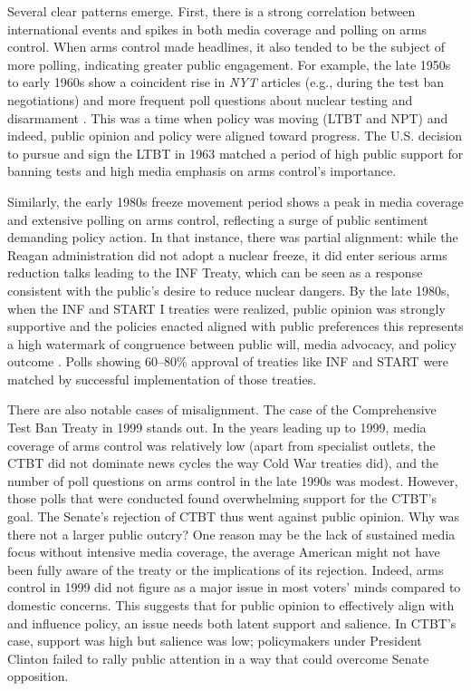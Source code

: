 \documentclass[11,5 pt]{article}
\begin{document}
    Several clear patterns emerge. First, there is a strong correlation between international events and spikes in both media coverage and polling on arms control. When arms control made headlines, it also tended to be the subject of more polling, indicating greater public engagement. For example, the late 1950s to early 1960s show a coincident rise in \textit{NYT} articles (e.g., during the test ban negotiations) and more frequent poll questions about nuclear testing and disarmament \cite{BritannicaNuclearTestBan}. This was a time when policy was moving (LTBT and NPT) and indeed, public opinion and policy were aligned toward progress. The U.S. decision to pursue and sign the LTBT in 1963 matched a period of high public support for banning tests and high media emphasis on arms control’s importance. 
    
    Similarly, the early 1980s freeze movement period shows a peak in media coverage and extensive polling on arms control, reflecting a surge of public sentiment demanding policy action. In that instance, there was partial alignment: while the Reagan administration did not adopt a nuclear freeze, it did enter serious arms reduction talks leading to the INF Treaty, which can be seen as a response consistent with the public’s desire to reduce nuclear dangers. By the late 1980s, when the INF and START I treaties were realized, public opinion was strongly supportive and the policies enacted aligned with public preferences this represents a high watermark of congruence between public will, media advocacy, and policy outcome \cite{TIME1987}. Polls showing 60–80\% approval of treaties like INF and START were matched by successful implementation of those treaties. 
    
    There are also notable cases of misalignment. The case of the Comprehensive Test Ban Treaty in 1999 stands out. In the years leading up to 1999, media coverage of arms control was relatively low (apart from specialist outlets, the CTBT did not dominate news cycles the way Cold War treaties did), and the number of poll questions on arms control in the late 1990s was modest. However, those polls that were conducted found overwhelming support for the CTBT’s goal. The Senate’s rejection of CTBT thus went against public opinion. Why was there not a larger public outcry? One reason may be the lack of sustained media focus without intensive media coverage, the average American might not have been fully aware of the treaty or the implications of its rejection. Indeed, arms control in 1999 did not figure as a major issue in most voters’ minds compared to domestic concerns. This suggests that for public opinion to effectively align with and influence policy, an issue needs both latent support and salience. In CTBT’s case, support was high but salience was low; policymakers under President Clinton failed to rally public attention in a way that could overcome Senate opposition. 
    
\end{document}
